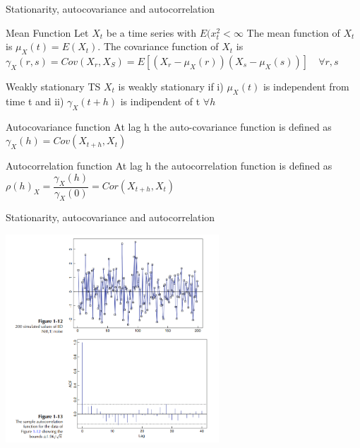 \documentclass[11pt]{beamer}
\begin{document}
\begin{frame}{Stationarity, autocovariance and autocorrelation\cite{brockwell2002introduction}}
\begin{alertblock}{Mean Function}
Let ${X_{t}}$ be a time series with $E({x}_{t}^{2}< \infty$  The mean function of ${X_{t}}$ is $\mu_{X}(t)=E(X_{t})$. The covariance function of ${X_{t}}$ is $\gamma_{X}(r,s)=Cov(X_{r},X_{S})=E[(X_{r}-\mu_{X}(r))(X_{s}-\mu_{X}(s))]\quad\forall r,s$ 
\end{alertblock}
\begin{alertblock}{Weakly stationary TS}
${X_{t}}$ is weakly stationary if i) $\mu_{X}(t)$ is independent from time t and ii) $\gamma_{X}(t+h)$ is indipendent of t $\forall h$
\end{alertblock}
\begin{alertblock}{Autocovariance function}
At lag h the auto-covariance function is defined as $\gamma_{X}(h)=Cov(X_{t+h},X_{t})$ 
\end{alertblock}
\begin{alertblock}{Autocorrelation function}
At lag h the autocorrelation function is defined as $\rho(h)_{X}=\dfrac{\gamma_{X}(h)}{\gamma_{X}(0)}=Cor({X}_{t+h},{X}_{t})$ 
\end{alertblock}
\end{frame}

\begin{frame}{Stationarity, autocovariance and autocorrelation \cite{brockwell2002introduction}}
    \begin{center}
     \includegraphics[width=0.6\textwidth]{Pic/ACF.png}
    \end{center}
\end{frame}
\end{document}
